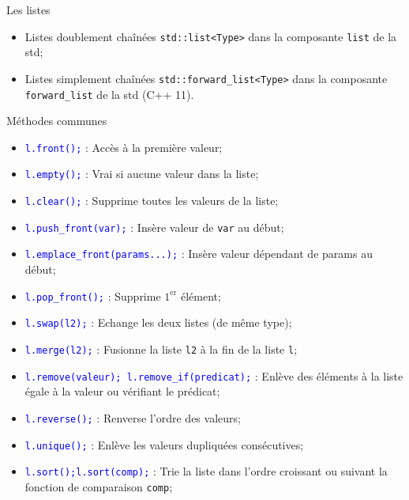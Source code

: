 \documentclass[compress,10pt,aspectratio=169]{beamer}
\begin{document}
\begin{frame}[fragile]{Les listes}
    \scriptsize
  
  \begin{itemize}
    \item Listes doublement chaînées \texttt{std::list<Type>} dans la composante \texttt{list} de la std;
    \item Listes simplement chaînées \texttt{std::forward_list<Type>} dans la composante \texttt{forward\_list} de la std (C++ 11).
  \end{itemize}

  \vspace*{-3mm}
  \begin{exampleblock}{\scriptsize Méthodes communes}
  \begin{itemize}
  \item \textcolor{blue}{\texttt{l.front();}} : Accès à la première valeur;
  \item \textcolor{blue}{\texttt{l.empty();}} : Vrai si aucune valeur dans la liste;
  \item \textcolor{blue}{\texttt{l.clear();}} : Supprime toutes les valeurs de la liste;
  \item \textcolor{blue}{\texttt{l.push\_front(var);}} : Insère valeur de \texttt{var} au début;
  \item \textcolor{blue}{\texttt{l.emplace\_front(params...);}} : Insère valeur dépendant de params au début;
  \item \textcolor{blue}{\texttt{l.pop\_front();}} : Supprime $1^{\mbox{er}}$ élément;
  \item \textcolor{blue}{\texttt{l.swap(l2);}} : Echange les deux listes (de même type);
  \item \textcolor{blue}{\texttt{l.merge(l2);}} : Fusionne la liste \texttt{l2} à la fin de la liste \texttt{l};
  \item \textcolor{blue}{\texttt{l.remove(valeur); l.remove\_if(predicat);}} : Enlève des éléments à la liste égale à la valeur ou vérifiant le prédicat;
  \item \textcolor{blue}{\texttt{l.reverse();}} : Renverse l'ordre des valeurs;
  \item \textcolor{blue}{\texttt{l.unique();}}  : Enlève les valeurs dupliquées consécutives;
  \item \textcolor{blue}{\texttt{l.sort();l.sort(comp);}} : Trie la liste dans l'ordre croissant ou suivant la fonction de comparaison \texttt{comp};
  \end{itemize}
  \end{exampleblock}  
  \end{frame}
  
\end{document}
